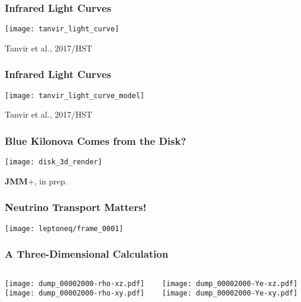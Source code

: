 \documentclass[]{beamer}
\begin{document}
\begin{frame}
  \frametitle{Infrared Light Curves}
  \begin{center}
    \texttt{[image: tanvir\_light\_curve]}
  \end{center}
  Tanvir et al., 2017/HST
\end{frame}

\begin{frame}
  \frametitle{Infrared Light Curves}
  \begin{center}
    \texttt{[image: tanvir\_light\_curve\_model]}
  \end{center}
  Tanvir et al., 2017/HST
\end{frame}

\begin{frame}
  \frametitle{Blue Kilonova Comes from the Disk?}
  \begin{center}
    \texttt{[image: disk\_3d\_render]}
  \end{center}
  \textbf{JMM}+, in prep.
\end{frame}

\begin{frame}
  \frametitle{Neutrino Transport Matters!}
  \begin{center}
    \texttt{[image: leptoneq/frame\_0001]}
  \end{center}
\end{frame}

\begin{frame}
  \frametitle{A Three-Dimensional Calculation}
  \begin{columns}
    \begin{column}{6cm}
      \begin{center}
        \texttt{[image: dump\_00002000-rho-xz.pdf]}\\
        \texttt{[image: dump\_00002000-rho-xy.pdf]}
      \end{center}
    \end{column}
    \begin{column}{6cm}
      \begin{center}
        \texttt{[image: dump\_00002000-Ye-xz.pdf]}\\
        \texttt{[image: dump\_00002000-Ye-xy.pdf]}
      \end{center}
    \end{column}
  \end{columns}
\end{frame}
\end{document}
